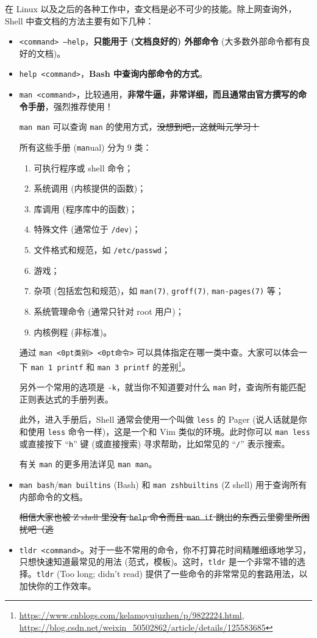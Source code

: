 \documentclass{article}
\begin{document}
	在 Linux 以及之后的各种工作中，查文档是必不可少的技能。除上网查询外，Shell 中查文档的方法主要有如下几种：
	\begin{itemize}
		\itemsep0pt
		\item \texttt{<command> --help}，\textbf{只能用于 (文档良好的) 外部命令} (大多数外部命令都有良好的文档)。
		\item \texttt{help <command>}，\textbf{Bash 中查询内部命令的方式}。
		\color{red}\item \texttt{man <command>}，比较通用，\textbf{非常牛逼，非常详细，而且通常由官方撰写的命令手册}，强烈推荐使用！

			\normalcolor\texttt{man man} 可以查询 \texttt{man} 的使用方式，\sout{没想到吧，这就叫元学习！}

			所有这些手册 (\texttt{man}ual) 分为 9 类\cite{man-man}：
			\begin{enumerate}
				\item 可执行程序或 shell 命令；
				\item 系统调用 (内核提供的函数)；
				\item 库调用 (程序库中的函数)；
				\item 特殊文件 (通常位于 \texttt{/dev})；
				\item 文件格式和规范，如 \texttt{/etc/passwd}；
				\item 游戏；
				\item 杂项 (包括宏包和规范)，如 \texttt{man(7)}, \texttt{groff(7)}, \texttt{man-pages(7)} 等；
				\item 系统管理命令 (通常只针对 root 用户)；
				\item 内核例程 (非标准)。
			\end{enumerate}

			通过 \texttt{man <\kern0pt类别\kern0pt> <\kern0pt命令\kern0pt>} 可以具体指定在哪一类中查。大家可以体会一下 \texttt{man 1 printf} 和 \texttt{man 3 printf} 的差别\footnote{\url{https://www.cnblogs.com/kelamoyujuzhen/p/9822224.html}, \url{https://blog.csdn.net/weixin_50502862/article/details/125583685}}。

			另外一个常用的选项是 \texttt{-k}，就当你不知道要对什么 \texttt{man} 时，查询所有能匹配正则表达式的手册列表。

			此外，进入手册后，Shell 通常会使用一个叫做 \texttt{less} 的 Pager (说人话就是你和使用 \texttt{less} 命令一样)，这是一个和 Vim 类似的环境。此时你可以 \texttt{man less} 或直接按下 ``\texttt h'' 键 (或直接搜索) 寻求帮助，比如常见的 ``\texttt /'' 表示搜索。

			有关 \texttt{man} 的更多用法详见 \texttt{man man}。
		\color{fuchsia}\item{}\label{item:docbuiltin}\texttt{man bash}/\texttt{man builtins} (Bash) 和 \texttt{man zshbuiltins} (Z shell) 用于查询所有内部命令的文档。

			\normalcolor\sout{相信大家也被 Z shell 里没有 \texttt{help} 命令而且 \texttt{man if} 跳出的东西云里雾里所困扰吧（逃}
		\item \texttt{tldr <command>}。对于一些不常用的命令，你不打算花时间精雕细琢地学习，只想快速知道最常见的用法 (范式，模板)。这时，\texttt{tldr} 是一个非常不错的选择。\texttt{tldr} (Too long; didn't read) 提供了一些命令的非常常见的套路用法，以加快你的工作效率。
	\end{itemize}
\end{document}
